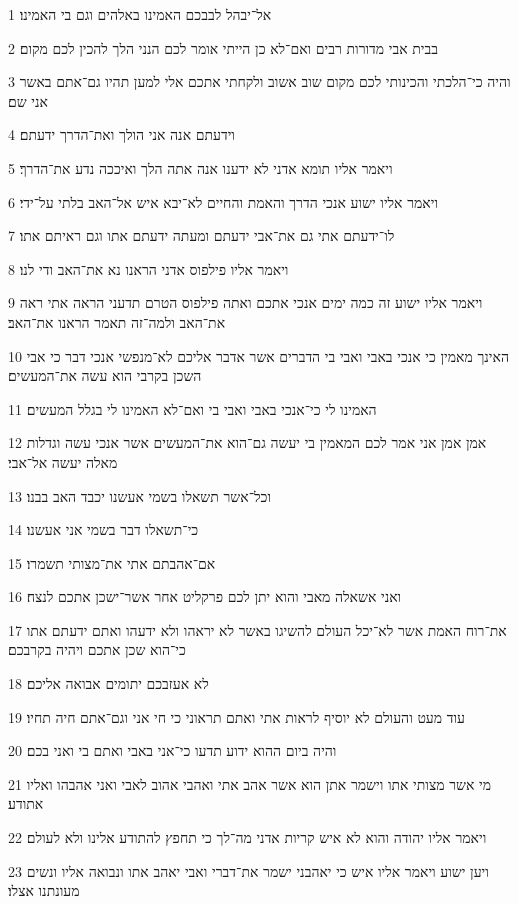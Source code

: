 \par 1 אל־יבהל לבבכם האמינו באלהים וגם בי האמינו׃
\par 2 בבית אבי מדורות רבים ואם־לא כן הייתי אומר לכם הנני הלך להכין לכם מקום׃
\par 3 והיה כי־הלכתי והכינותי לכם מקום שוב אשוב ולקחתי אתכם אלי למען תהיו גם־אתם באשר אני שם׃
\par 4 וידעתם אנה אני הולך ואת־הדרך ידעתם׃
\par 5 ויאמר אליו תומא אדני לא ידענו אנה אתה הלך ואיככה נדע את־הדרך׃
\par 6 ויאמר אליו ישוע אנכי הדרך והאמת והחיים לא־יבא איש אל־האב בלתי על־ידי׃
\par 7 לו־ידעתם אתי גם את־אבי ידעתם ומעתה ידעתם אתו וגם ראיתם אתו׃
\par 8 ויאמר אליו פילפוס אדני הראנו נא את־האב ודי לנו׃
\par 9 ויאמר אליו ישוע זה כמה ימים אנכי אתכם ואתה פילפוס הטרם תדעני הראה אתי ראה את־האב ולמה־זה תאמר הראנו את־האב׃
\par 10 האינך מאמין כי אנכי באבי ואבי בי הדברים אשר אדבר אליכם לא־מנפשי אנכי דבר כי אבי השכן בקרבי הוא עשה את־המעשים׃
\par 11 האמינו לי כי־אנכי באבי ואבי בי ואם־לא האמינו לי בגלל המעשים׃
\par 12 אמן אמן אני אמר לכם המאמין בי יעשה גם־הוא את־המעשים אשר אנכי עשה וגדלות מאלה יעשה אל־אבי׃
\par 13 וכל־אשר תשאלו בשמי אעשנו יכבד האב בבנו׃
\par 14 כי־תשאלו דבר בשמי אני אעשנו׃
\par 15 אם־אהבתם אתי את־מצותי תשמרו׃
\par 16 ואני אשאלה מאבי והוא יתן לכם פרקליט אחר אשר־ישכן אתכם לנצח׃
\par 17 את־רוח האמת אשר לא־יכל העולם להשיגו באשר לא יראהו ולא ידעהו ואתם ידעתם אתו כי־הוא שכן אתכם ויהיה בקרבכם׃
\par 18 לא אעזבכם יתומים אבואה אליכם׃
\par 19 עוד מעט והעולם לא יוסיף לראות אתי ואתם תראוני כי חי אני וגם־אתם חיה תחיו׃
\par 20 והיה ביום ההוא ידוע תדעו כי־אני באבי ואתם בי ואני בכם׃
\par 21 מי אשר מצותי אתו וישמר אתן הוא אשר אהב אתי ואהבי אהוב לאבי ואני אהבהו ואליו אתודע׃
\par 22 ויאמר אליו יהודה והוא לא איש קריות אדני מה־לך כי תחפץ להתודע אלינו ולא לעולם׃
\par 23 ויען ישוע ויאמר אליו איש כי יאהבני ישמר את־דברי ואבי יאהב אתו ונבואה אליו ונשים מעונתנו אצלו׃
